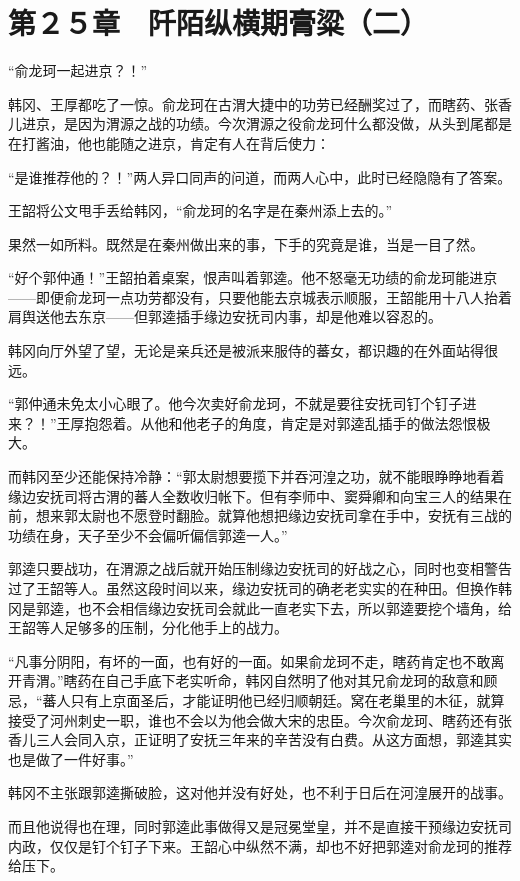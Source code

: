 \section{第２５章　阡陌纵横期膏粱（二）  }

“俞龙珂一起进京？！”

韩冈、王厚都吃了一惊。俞龙珂在古渭大捷中的功劳已经酬奖过了，而瞎药、张香儿进京，是因为渭源之战的功绩。今次渭源之役俞龙珂什么都没做，从头到尾都是在打酱油，他也能随之进京，肯定有人在背后使力：

“是谁推荐他的？！”两人异口同声的问道，而两人心中，此时已经隐隐有了答案。

王韶将公文甩手丢给韩冈，“俞龙珂的名字是在秦州添上去的。”

果然一如所料。既然是在秦州做出来的事，下手的究竟是谁，当是一目了然。

“好个郭仲通！”王韶拍着桌案，恨声叫着郭逵。他不怒毫无功绩的俞龙珂能进京——即便俞龙珂一点功劳都没有，只要他能去京城表示顺服，王韶能用十八人抬着肩舆送他去东京——但郭逵插手缘边安抚司内事，却是他难以容忍的。

韩冈向厅外望了望，无论是亲兵还是被派来服侍的蕃女，都识趣的在外面站得很远。

“郭仲通未免太小心眼了。他今次卖好俞龙珂，不就是要往安抚司钉个钉子进来？！”王厚抱怨着。从他和他老子的角度，肯定是对郭逵乱插手的做法怨恨极大。

而韩冈至少还能保持冷静：“郭太尉想要揽下并吞河湟之功，就不能眼睁睁地看着缘边安抚司将古渭的蕃人全数收归帐下。但有李师中、窦舜卿和向宝三人的结果在前，想来郭太尉也不愿登时翻脸。就算他想把缘边安抚司拿在手中，安抚有三战的功绩在身，天子至少不会偏听偏信郭逵一人。”

郭逵只要战功，在渭源之战后就开始压制缘边安抚司的好战之心，同时也变相警告过了王韶等人。虽然这段时间以来，缘边安抚司的确老老实实的在种田。但换作韩冈是郭逵，也不会相信缘边安抚司会就此一直老实下去，所以郭逵要挖个墙角，给王韶等人足够多的压制，分化他手上的战力。

“凡事分阴阳，有坏的一面，也有好的一面。如果俞龙珂不走，瞎药肯定也不敢离开青渭。”瞎药在自己手底下老实听命，韩冈自然明了他对其兄俞龙珂的敌意和顾忌，“蕃人只有上京面圣后，才能证明他已经归顺朝廷。窝在老巢里的木征，就算接受了河州刺史一职，谁也不会以为他会做大宋的忠臣。今次俞龙珂、瞎药还有张香儿三人会同入京，正证明了安抚三年来的辛苦没有白费。从这方面想，郭逵其实也是做了一件好事。”

韩冈不主张跟郭逵撕破脸，这对他并没有好处，也不利于日后在河湟展开的战事。

而且他说得也在理，同时郭逵此事做得又是冠冕堂皇，并不是直接干预缘边安抚司内政，仅仅是钉个钉子下来。王韶心中纵然不满，却也不好把郭逵对俞龙珂的推荐给压下。


